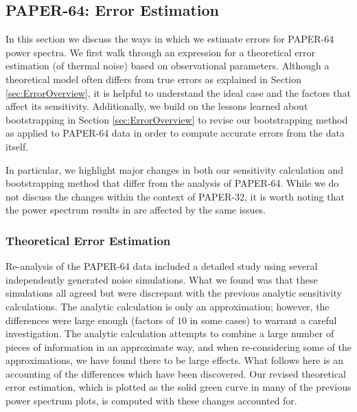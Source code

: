 \documentclass[preprint2,numberedappendix,tighten]{aastex6}  %
\begin{document}

\subsection{PAPER-64: Error Estimation}
\label{sec:Error}

In this section we discuss the ways in which we estimate errors for PAPER-64 power spectra. We first walk through an expression for a theoretical error estimation (of thermal noise) based on observational parameters. Although a theoretical model often 
differs from true errors as explained in Section \ref{sec:ErrorOverview}, it is helpful to understand the ideal case and the factors 
that affect its sensitivity. Additionally, we build on the lessons learned about bootstrapping in Section \ref{sec:ErrorOverview} to 
revise our bootstrapping method as applied to PAPER-64 data in order to compute accurate errors from the data itself.

In particular, we highlight major changes in both our sensitivity calculation and bootstrapping method that differ from the  
analysis of PAPER-64. While we do not discuss the changes within the context of PAPER-32, it is worth noting that the power 
spectrum results in \citet{parsons_et_al2014} are affected by the same issues.

\subsubsection{Theoretical Error Estimation}
\label{sec:PSSense}

Re-analysis of the PAPER-64 data included a detailed study using several independently generated noise simulations. What we 
found was that these simulations all agreed but were discrepant with the previous analytic sensitivity calculations. The analytic 
calculation is only an approximation; however, the differences were large enough (factors of $10$ in some cases) to warrant a 
careful investigation. The analytic calculation attempts to combine a large number of pieces of information in an approximate 
way, and when re-considering some of the approximations, we have found there to be large effects. What follows here is an 
accounting of the differences which have been discovered. Our revised theoretical error estimation, which is plotted as the solid green curve in many of the previous power spectrum plots, is computed with these changes accounted for.
\end{document}
